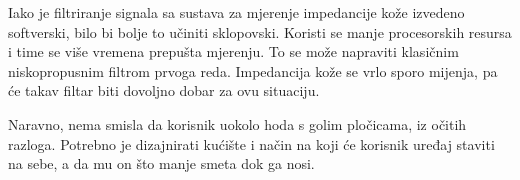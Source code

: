 Iako je filtriranje signala sa sustava za mjerenje impedancije kože izvedeno softverski, bilo bi bolje to učiniti sklopovski. Koristi se manje procesorskih resursa i time se više vremena prepušta mjerenju. To se može napraviti klasičnim niskopropusnim filtrom prvoga reda. Impedancija kože se vrlo sporo mijenja, pa će takav filtar biti dovoljno dobar za ovu situaciju.

Naravno, nema smisla da korisnik uokolo hoda s golim pločicama, iz očitih razloga. Potrebno je dizajnirati kućište i način na koji će korisnik uređaj staviti na sebe, a da mu on što manje smeta dok ga nosi.